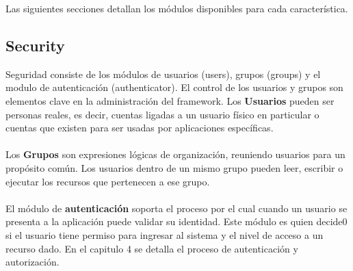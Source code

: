 Las siguientes secciones detallan los módulos disponibles para cada característica. 

\subsection{Security}
Seguridad consiste de los módulos de usuarios (users), grupos (groups) y el modulo de autenticación (authenticator). El control de los usuarios y grupos son elementos clave en la administración del framework. Los \textbf{Usuarios} pueden ser personas reales, es decir, cuentas ligadas a un usuario físico en particular o cuentas que existen para ser usadas por aplicaciones específicas. \\
\\
Los \textbf{Grupos} son expresiones lógicas de organización, reuniendo usuarios para un propósito común. Los usuarios dentro de un mismo grupo pueden leer, escribir o ejecutar los recursos que pertenecen a ese grupo.\\
\\
El módulo de \textbf{autenticación} soporta el proceso por el cual cuando un usuario se presenta a la aplicación puede validar su identidad. Este módulo es quien decide0 si el usuario tiene permiso para ingresar al sistema y el nivel de acceso a un recurso dado. En el capitulo 4 se detalla el proceso de autenticación y autorización.

